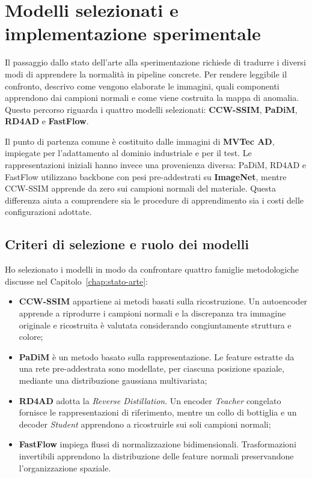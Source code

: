 \chapter[Modelli selezionati e implementazione]{Modelli selezionati e implementazione sperimentale}
\label{chap:implementazione}

Il passaggio dallo stato dell'arte alla sperimentazione richiede di tradurre i diversi modi di apprendere la normalità in pipeline concrete. Per rendere leggibile il confronto, descrivo come vengono elaborate le immagini, quali componenti apprendono dai campioni normali e come viene costruita la mappa di anomalia. Questo percorso riguarda i quattro modelli selezionati: \textbf{CCW-SSIM}, \textbf{PaDiM}, \textbf{RD4AD} e \textbf{FastFlow}.

Il punto di partenza comune è costituito dalle immagini di \textbf{MVTec AD}, impiegate per l'adattamento al dominio industriale e per il test. Le rappresentazioni iniziali hanno invece una provenienza diversa: PaDiM, RD4AD e FastFlow utilizzano backbone con pesi pre-addestrati su \textbf{ImageNet}, mentre CCW-SSIM apprende da zero sui campioni normali del materiale. Questa differenza aiuta a comprendere sia le procedure di apprendimento sia i costi delle configurazioni adottate.

\section{Criteri di selezione e ruolo dei modelli}
\label{sec:cap3-criteri}

Ho selezionato i modelli in modo da confrontare quattro famiglie metodologiche discusse nel Capitolo~\ref{chap:stato-arte}:
\begin{itemize}
    \item \textbf{CCW-SSIM} \cite{Berasi_2023} appartiene ai metodi basati sulla ricostruzione. Un autoencoder apprende a riprodurre i campioni normali e la discrepanza tra immagine originale e ricostruita è valutata considerando congiuntamente struttura e colore;
    \item \textbf{PaDiM} \cite{Defard_et_al._2021} è un metodo basato sulla rappresentazione. Le feature estratte da una rete pre-addestrata sono modellate, per ciascuna posizione spaziale, mediante una distribuzione gaussiana multivariata;
    \item \textbf{RD4AD} \cite{Deng_et_al._2022} adotta la \textit{Reverse Distillation}. Un encoder \textit{Teacher} congelato fornisce le rappresentazioni di riferimento, mentre un collo di bottiglia e un decoder \textit{Student} apprendono a ricostruirle sui soli campioni normali;
    \item \textbf{FastFlow} \cite{Yu_et_al._2021} impiega flussi di normalizzazione bidimensionali. Trasformazioni invertibili apprendono la distribuzione delle feature normali preservandone l'organizzazione spaziale.
\end{itemize}

